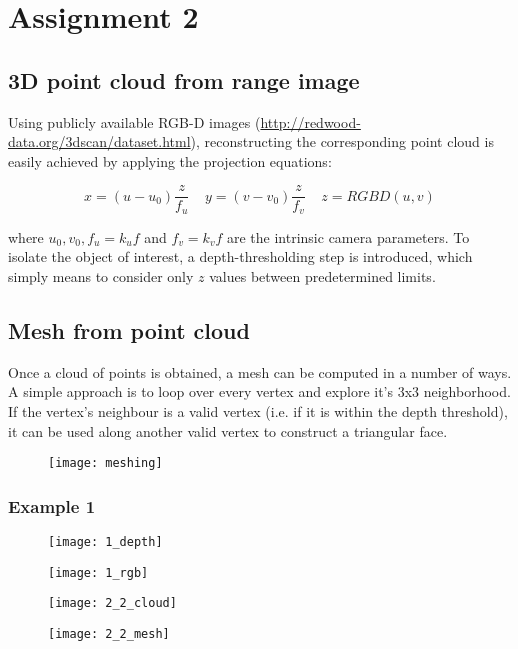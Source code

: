\section{Assignment 2}

\subsection{3D point cloud from range image}

Using publicly available RGB-D images (\url{http://redwood-data.org/3dscan/dataset.html}), reconstructing the corresponding point cloud is easily achieved by applying the projection equations:

\begin{equation*}
x = (u - u_0)\frac{z}{f_u}\;\;\;\;y = (v - v_0)\frac{z}{f_v}\;\;\;\;z = RGBD(u,v)
\end{equation*}

where $u_0,v_0,f_u=k_uf$ and $f_v=k_vf$ are the intrinsic camera parameters. To isolate the object of interest, a depth-thresholding step is introduced, which simply means to consider only $z$ values between predetermined limits.


\subsection{Mesh from point cloud}

Once a cloud of points is obtained, a mesh can be computed in a number of ways. A simple approach is to loop over every vertex and explore it's 3x3 neighborhood. If the vertex's neighbour is a valid vertex (i.e. if it is within the depth threshold), it can be used along another valid vertex to construct a triangular face.

\begin{figure}[h]
\centering
\texttt{[image: meshing]}
\end{figure}

\subsubsection{Example 1}

\begin{figure}[h]
\centering
\begin{minipage}{0.45\textwidth}
\texttt{[image: 1\_depth]}
\end{minipage}
\begin{minipage}{0.45\textwidth}
\texttt{[image: 1\_rgb]}
\end{minipage}
\end{figure}
\begin{figure}[h]
\centering
\begin{minipage}{0.45\textwidth}
\texttt{[image: 2\_2\_cloud]}
\end{minipage}
\begin{minipage}{0.45\textwidth}
\texttt{[image: 2\_2\_mesh]}
\end{minipage}
\end{figure}


